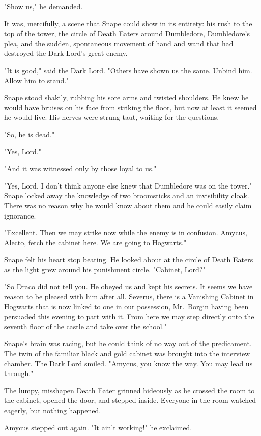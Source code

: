 "Show us," he demanded.

It was, mercifully, a scene that Snape could show in its entirety: his rush to the top of the tower, the circle of Death Eaters around Dumbledore, Dumbledore's plea, and the sudden, spontaneous movement of hand and wand that had destroyed the Dark Lord's great enemy.

"It is good," said the Dark Lord. "Others have shown us the same. Unbind him. Allow him to stand."

Snape stood shakily, rubbing his sore arms and twisted shoulders. He knew he would have bruises on his face from striking the floor, but now at least it seemed he would live. His nerves were strung taut, waiting for the questions.

"So, he is dead."

"Yes, Lord."

"And it was witnessed only by those loyal to us."

"Yes, Lord. I don't think anyone else knew that Dumbledore was on the tower." Snape locked away the knowledge of two broomsticks and an invisibility cloak. There was no reason why he would know about them and he could easily claim ignorance.

"Excellent. Then we may strike now while the enemy is in confusion. Amycus, Alecto, fetch the cabinet here. We are going to Hogwarts."

Snape felt his heart stop beating. He looked about at the circle of Death Eaters as the light grew around his punishment circle. "Cabinet, Lord?"

"So Draco did not tell you. He obeyed us and kept his secrets. It seems we have reason to be pleased with him after all. Severus, there is a Vanishing Cabinet in Hogwarts that is now linked to one in our possession, Mr.~Borgin having been persuaded this evening to part with it. From here we may step directly onto the seventh floor of the castle and take over the school."

Snape's brain was racing, but he could think of no way out of the predicament. The twin of the familiar black and gold cabinet was brought into the interview chamber. The Dark Lord smiled. "Amycus, you know the way. You may lead us through."

The lumpy, misshapen Death Eater grinned hideously as he crossed the room to the cabinet, opened the door, and stepped inside. Everyone in the room watched eagerly, but nothing happened.

Amycus stepped out again. "It ain't working!" he exclaimed.

